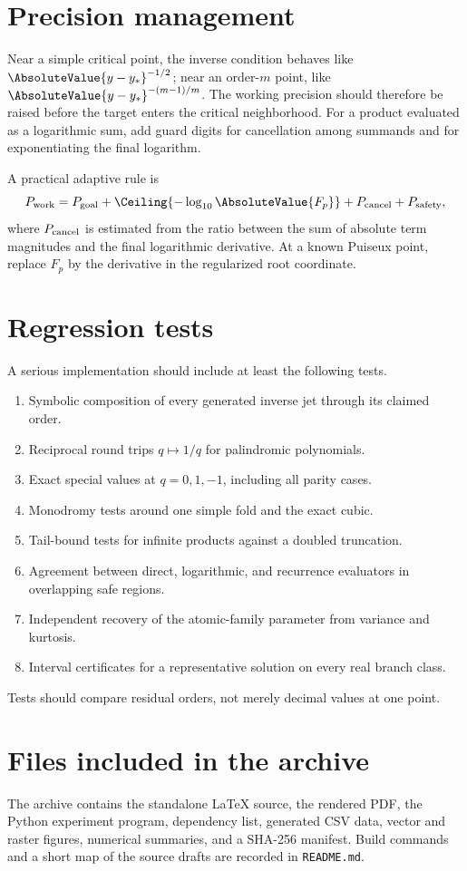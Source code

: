 \documentclass[11pt,letterpaper,oneside,openany]{book}
\theoremstyle{definition}
\theoremstyle{remark}
\begin{document}
\section{Precision management}
Near a simple critical point, the inverse condition behaves like
\(\AbsoluteValue{y-y_*}^{-1/2}\); near an order-\(m\) point, like
\(\AbsoluteValue{y-y_*}^{-(m-1)/m}\).  The working precision should therefore be raised
before the target enters the critical neighborhood.  For a product evaluated
as a logarithmic sum, add guard digits for cancellation among summands and for
exponentiating the final logarithm.

A practical adaptive rule is
\[
 P_{\rm work}=P_{\rm goal}
 +\Ceiling{-\log_{10}\AbsoluteValue{F_p}}
 +P_{\rm cancel}+P_{\rm safety},
\]
where \(P_{\rm cancel}\) is estimated from the ratio between the sum of
absolute term magnitudes and the final logarithmic derivative.  At a known
Puiseux point, replace \(F_p\) by the derivative in the regularized root
coordinate.

\section{Regression tests}
A serious implementation should include at least the following tests.
\begin{enumerate}
\item Symbolic composition of every generated inverse jet through its claimed
order.
\item Reciprocal round trips \(q\mapsto1/q\) for palindromic polynomials.
\item Exact special values at \(q=0,1,-1\), including all parity cases.
\item Monodromy tests around one simple fold and the exact cubic.
\item Tail-bound tests for infinite products against a doubled truncation.
\item Agreement between direct, logarithmic, and recurrence evaluators in
overlapping safe regions.
\item Independent recovery of the atomic-family parameter from variance and
kurtosis.
\item Interval certificates for a representative solution on every real
branch class.
\end{enumerate}
Tests should compare residual orders, not merely decimal values at one point.

\section{Files included in the archive}
The archive contains the standalone LaTeX source, the rendered PDF, the Python
experiment program, dependency list, generated CSV data, vector and raster
figures, numerical summaries, and a SHA-256 manifest.  Build commands and a
short map of the source drafts are recorded in \texttt{README.md}.
\end{document}
